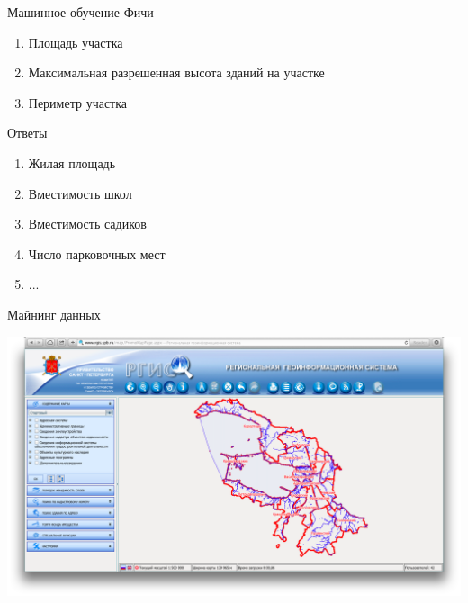 \documentclass[14pt, fleqn, xcolor={dvipsnames, table}]{beamer}
\begin{document}
        \begin{frame}{Машинное обучение}
            Фичи
            \begin{enumerate}
               \item Площадь участка
               \item Максимальная разрешенная высота зданий на участке
               \item Периметр участка
            \end{enumerate}
            Ответы
            \begin{enumerate}
               \item Жилая площадь
               \item Вместимость школ
               \item Вместимость садиков
               \item Число парковочных мест
               \item ...
            \end{enumerate}           
        \end{frame}
        
        \begin{frame}{Майнинг данных}
            \begin{center}
                \includegraphics[scale=0.23]{rgis.png}
            \end{center} 
        \end{frame}
        
\end{document}
